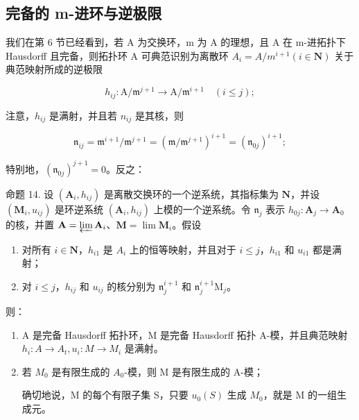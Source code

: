 \subsection{完备的 m-进环与逆极限}

	我们在第 6 节已经看到，若 A 为交换环，m 为 A 的理想，且 A 在 m-进拓扑下 Hausdorff 且完备，则拓扑环 A 可典范识别为离散环 \(A_{i} = A/m^{i+1} (i \in \mathbf{N})\) 关于典范映射所成的逆极限

\[
h _ {i j} \colon \mathrm{A} / \mathfrak {m} ^ {j + 1} \rightarrow \mathrm{A} / \mathfrak {m} ^ {i + 1} \quad (i \leqslant j);
\]

	注意，\(h_{ij}\) 是满射，并且若 \(n_{ij}\) 是其核，则

\[
\mathfrak {n} _ {i j} = \mathfrak {m} ^ {i + 1} / \mathfrak {m} ^ {j + 1} = (\mathfrak {m} / \mathfrak {m} ^ {j + 1}) ^ {i + 1} = (\mathfrak {n} _ {0 j}) ^ {i + 1};
\]

	特别地，\((\mathfrak{n}_{0j})^{j + 1} = 0\)。反之：

	命题 14. 设 \((\mathbf{A}_i, h_{ij})\) 是离散交换环的一个逆系统，其指标集为 \(\mathbf{N}\)，并设 \((\mathbf{M}_i, u_{ij})\) 是环逆系统 \((\mathbf{A}_i, h_{ij})\) 上模的一个逆系统。令 \(\mathfrak{n}_j\) 表示 \(h_{0j} \colon \mathbf{A}_j \to \mathbf{A}_0\) 的核，并置 \(\mathbf{A} = \varprojlim \mathbf{A}_i\)、\(\mathbf{M} = \lim \mathbf{M}_i\)。假设

\begin{enumerate}
\def\labelenumi{(\alph{enumi})}
\item
	  对所有 \(i \in \mathbf{N}\)，\(h_{i1}\) 是 \(A_i\) 上的恒等映射，并且对于 \(i \leqslant j\)，\(h_{i1}\) 和 \(u_{i1}\) 都是满射；
\item
	  对 \(i \leqslant j\)，\(h_{ij}\) 和 \(u_{ij}\) 的核分别为 \(\mathfrak{n}_j^{i+1}\) 和 \(\mathfrak{n}_j^{i+1}\mathrm{M}_j\)。
\end{enumerate}

	则：

\begin{enumerate}
\def\labelenumi{(\roman{enumi})}
\item
	  A 是完备 Hausdorff 拓扑环，M 是完备 Hausdorff 拓扑 A-模，并且典范映射 \(h_{i}: A \to A_{t}, u_{i}: M \to M_{i}\) 是满射。
\item
	  若 \(M_{0}\) 是有限生成的 \(A_{0}\)-模，则 M 是有限生成的 A-模；

	  确切地说，M 的每个有限子集 S，只要 \(u_{0}(S)\) 生成 \(M_{0}\)，就是 M 的一组生成元。
\end{enumerate}


